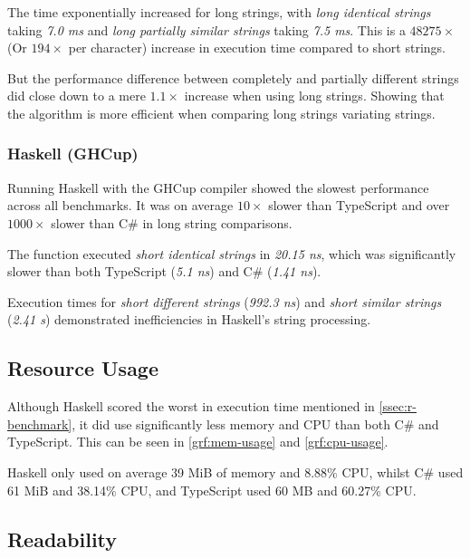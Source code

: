 The time exponentially increased for long strings, with \textit{long identical strings} taking
\textit{7.0 ms} and \textit{long partially similar strings} taking \textit{7.5 ms}. This is a
$48275 \times$ (Or $194 \times$ per character) increase in execution time compared to short strings.

But the performance difference between completely and partially different strings did close down to
a mere $1.1 \times$ increase when using long strings. Showing that the algorithm is more efficient
when comparing long strings variating strings.

\subsubsection{Haskell (GHCup)}
Running Haskell with the GHCup compiler showed the slowest performance across all benchmarks.
It was on average $10 \times$ slower than TypeScript and over $1000 \times$ slower than C\# in long string comparisons.

The function executed \textit{short identical strings} in \textit{20.15 ns}, which was significantly slower than both TypeScript (\textit{5.1 ns}) and C\# (\textit{1.41 ns}).

Execution times for \textit{short different strings} (\textit{992.3 ns}) and
\textit{short similar strings} (\textit{2.41 s}) demonstrated inefficiencies in Haskell's string
processing.

\subsection{Resource Usage}

Although Haskell scored the worst in execution time mentioned in \autoref{ssec:r-benchmark}, it did
use significantly less memory and CPU than both C\# and TypeScript.
This can be seen in \autoref{grf:mem-usage} and \autoref{grf:cpu-usage}.

Haskell only used on average 39 MiB of memory and 8.88\% CPU,
whilst C\# used 61 MiB and 38.14\% CPU,
and TypeScript used 60 MB and 60.27\% CPU.

\subsection{Readability}

